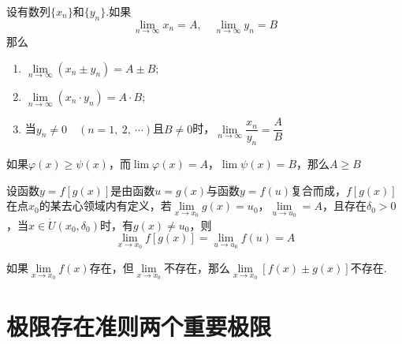 \begin{theorem}
	设有数列\( \{x_{n}\} \)和\( \{y_{n}\} \).如果
	\[ \lim\limits_{n \to \infty}x_{n} = A,\quad \lim\limits_{n \to \infty}y_{n} = B \]
	那么
	\begin{enumerate}
		\item \( \lim\limits_{n \to \infty}(x_{n} \pm y_{n}) = A \pm B \);
		\item \( \lim\limits_{n \to \infty}(x_{n} \cdot y_{n}) = A \cdot B \);
		\item 当\( y_{n} \neq 0\quad(n =1,\ 2,\ \cdots) \)且\( B \neq 0 \)时，\( \lim\limits_{n \to \infty}\dfrac{x_{n}}{y_{n}} = \dfrac{A}{B} \)
	\end{enumerate}
\end{theorem}

\begin{theorem}
	如果\( \varphi (x) \geqslant \psi (x) \)，而\( \lim \varphi (x) = A \)，\( \lim \psi (x) = B \)，那么\( A \geqslant B \)
\end{theorem}

\begin{theorem}[复合函数的极限运算法则]
	设函数\( y = f[g(x)] \)是由函数\( u = g(x) \)与函数\( y = f(u) \)复合而成，\( f[g(x)] \)在点\( x_{0} \)的某去心领域内有定义，若\( \lim\limits_{x \to x_{0}}g(x) = u_{0} \)，\( \lim\limits_{u \to u_{0}} = A \)，且存在\( \delta_{0} > 0 \)，当\( x \in \mathring{U}(x_{0}, \delta_{0}) \)时，有\( g(x) \neq u_{0} \)，则
	\[ \lim\limits_{x \to x_{0}}f[g(x)] = \lim\limits_{u \to u_{0}}f(u) = A \]
\end{theorem}

\begin{theorem}
	如果\( \lim\limits_{x \to x_{0}}f(x) \)存在，但\( \lim\limits_{x \to x_{0}} \)不存在，那么\( \lim\limits_{x \to x_{0}}[f(x) \pm g(x)] \)不存在.
\end{theorem}

\section{极限存在准则\quad 两个重要极限}

